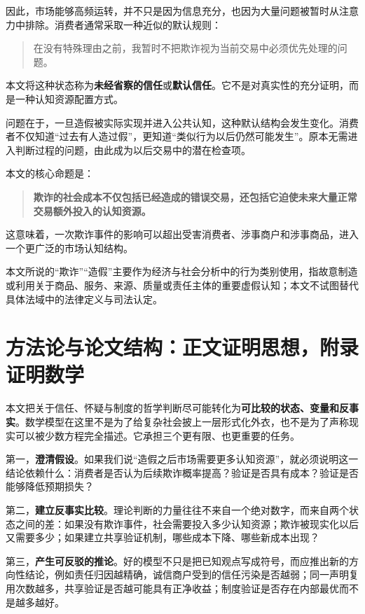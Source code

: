 \documentclass[UTF8,12pt]{ctexart}
\begin{document}
因此，市场能够高频运转，并不只是因为信息充分，也因为大量问题被暂时从注意力中排除。消费者通常采取一种近似的默认规则：

\begin{quote}
在没有特殊理由之前，我暂时不把欺诈视为当前交易中必须优先处理的问题。
\end{quote}

本文将这种状态称为\textbf{未经省察的信任}或\textbf{默认信任}。它不是对真实性的充分证明，而是一种认知资源配置方式。

问题在于，一旦造假被实际实现并进入公共认知，这种默认结构会发生变化。消费者不仅知道“过去有人造过假”，更知道“类似行为以后仍然可能发生”。原本无需进入判断过程的问题，由此成为以后交易中的潜在检查项。

本文的核心命题是：

\begin{quote}
\textbf{欺诈的社会成本不仅包括已经造成的错误交易，还包括它迫使未来大量正常交易额外投入的认知资源。}
\end{quote}

这意味着，一次欺诈事件的影响可以超出受害消费者、涉事商户和涉事商品，进入一个更广泛的市场认知结构。

本文所说的“欺诈”“造假”主要作为经济与社会分析中的行为类别使用，指故意制造或利用关于商品、服务、来源、质量或责任主体的重要虚假认知；本文不试图替代具体法域中的法律定义与司法认定。

\section{方法论与论文结构：正文证明思想，附录证明数学}

本文把关于信任、怀疑与制度的哲学判断尽可能转化为\textbf{可比较的状态、变量和反事实}。数学模型在这里不是为了给复杂社会披上一层形式化外衣，也不是为了声称现实可以被少数方程完全描述。它承担三个更有限、也更重要的任务。

第一，\textbf{澄清假设}。如果我们说“造假之后市场需要更多认知资源”，就必须说明这一结论依赖什么：消费者是否认为后续欺诈概率提高？验证是否具有成本？验证是否能够降低预期损失？

第二，\textbf{建立反事实比较}。理论判断的力量往往不来自一个绝对数字，而来自两个状态之间的差：如果没有欺诈事件，社会需要投入多少认知资源；欺诈被现实化以后又需要多少；如果建立共享验证机制，哪些成本下降、哪些新成本出现？

第三，\textbf{产生可反驳的推论}。好的模型不只是把已知观点写成符号，而应推出新的方向性结论，例如责任归因越精确，诚信商户受到的信任污染是否越弱；同一声明复用次数越多，共享验证是否越可能具有正净收益；制度验证是否存在内部最优而不是越多越好。
\end{document}
